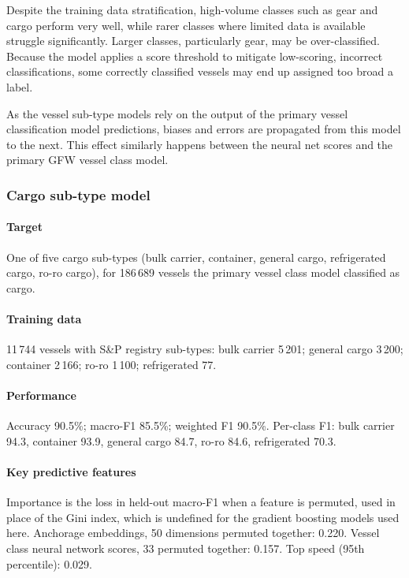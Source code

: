 \documentclass[lineno,pdflatex,sn-nature]{sn-jnl}
\begin{document}
Despite the training data stratification, high-volume classes such as gear and cargo perform very well, while rarer classes where limited data is available struggle significantly. Larger classes, particularly gear, may be over-classified. Because the model applies a score threshold to mitigate low-scoring, incorrect classifications, some correctly classified vessels may end up assigned too broad a label.

As the vessel sub-type models rely on the output of the primary vessel classification model predictions, biases and errors are propagated from this model to the next. This effect similarly happens between the neural net scores and the primary GFW vessel class model.


\subsubsection{Cargo sub-type model}
\label{sec:cargo-submodel}

\paragraph{Target}

One of five cargo sub-types (bulk carrier, container, general cargo, refrigerated cargo, ro-ro cargo), for 186\,689 vessels the primary vessel class model classified as cargo.

\paragraph{Training data}

11\,744 vessels with S\&P registry sub-types: bulk carrier 5\,201; general cargo 3\,200; container 2\,166; ro-ro 1\,100; refrigerated 77.

\paragraph{Performance}

Accuracy 90.5\%; macro-F1 85.5\%; weighted F1 90.5\%. Per-class F1: bulk carrier 94.3, container 93.9, general cargo 84.7, ro-ro 84.6, refrigerated 70.3.

\paragraph{Key predictive features}

Importance is the loss in held-out macro-F1 when a feature is permuted, used in place of the Gini index, which is undefined for the gradient boosting models used here. Anchorage embeddings, 50 dimensions permuted together: 0.220. Vessel class neural network scores, 33 permuted together: 0.157. Top speed (95th percentile): 0.029.
\end{document}
